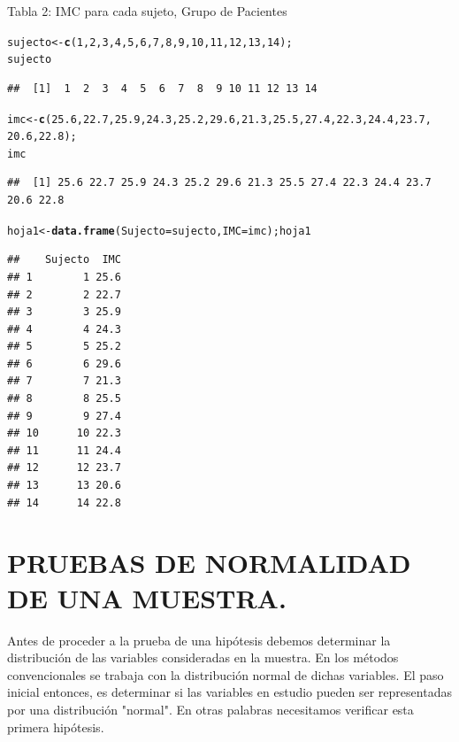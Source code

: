 \documentclass[12pt,letterpaper]{article}\usepackage[]{graphicx}\usepackage[]{color}
\makeatletter
\newcommand{\hlnum}[1]{\textcolor[rgb]{0.686,0.059,0.569}{#1}}%
\newcommand{\hlstd}[1]{\textcolor[rgb]{0.345,0.345,0.345}{#1}}%
\newcommand{\hlkwb}[1]{\textcolor[rgb]{0.69,0.353,0.396}{#1}}%
\newcommand{\hlkwc}[1]{\textcolor[rgb]{0.333,0.667,0.333}{#1}}%
\newcommand{\hlkwd}[1]{\textcolor[rgb]{0.737,0.353,0.396}{\textbf{#1}}}%
\newenvironment{kframe}{%
 \def\at@end@of@kframe{}%
 \ifinner\ifhmode%
  \def\at@end@of@kframe{\end{minipage}}%
  \begin{minipage}{\columnwidth}%
 \fi\fi%
 \def\FrameCommand##1{\hskip\@totalleftmargin \hskip-\fboxsep
 \colorbox{shadecolor}{##1}\hskip-\fboxsep
     \hskip-\linewidth \hskip-\@totalleftmargin \hskip\columnwidth}%
 \MakeFramed {\advance\hsize-\width
   \@totalleftmargin\z@ \linewidth\hsize
   \@setminipage}}%
 {\par\unskip\endMakeFramed%
 \at@end@of@kframe}
\newenvironment{knitrout}{}{} %
\makeatother
\begin{document}
Tabla 2: IMC para cada sujeto, Grupo de Pacientes
\begin{knitrout}
\color{fgcolor}\begin{kframe}
\begin{alltt}
\hlstd{sujecto} \hlkwb{<-} \hlkwd{c}\hlstd{(}\hlnum{1}\hlstd{,} \hlnum{2}\hlstd{,} \hlnum{3}\hlstd{,} \hlnum{4}\hlstd{,} \hlnum{5}\hlstd{,} \hlnum{6}\hlstd{,} \hlnum{7}\hlstd{,} \hlnum{8}\hlstd{,} \hlnum{9}\hlstd{,} \hlnum{10}\hlstd{,} \hlnum{11}\hlstd{,} \hlnum{12}\hlstd{,} \hlnum{13}\hlstd{,} \hlnum{14}\hlstd{);}
\hlstd{sujecto}
\end{alltt}
\begin{verbatim}
##  [1]  1  2  3  4  5  6  7  8  9 10 11 12 13 14
\end{verbatim}
\begin{alltt}
\hlstd{imc} \hlkwb{<-} \hlkwd{c}\hlstd{(}\hlnum{25.6}\hlstd{,} \hlnum{22.7}\hlstd{,} \hlnum{25.9}\hlstd{,} \hlnum{24.3}\hlstd{,} \hlnum{25.2}\hlstd{,} \hlnum{29.6}\hlstd{,} \hlnum{21.3}\hlstd{,} \hlnum{25.5}\hlstd{,} \hlnum{27.4}\hlstd{,} \hlnum{22.3}\hlstd{,} \hlnum{24.4}\hlstd{,} \hlnum{23.7}\hlstd{,}
         \hlnum{20.6}\hlstd{,} \hlnum{22.8}\hlstd{);}
\hlstd{imc}
\end{alltt}
\begin{verbatim}
##  [1] 25.6 22.7 25.9 24.3 25.2 29.6 21.3 25.5 27.4 22.3 24.4 23.7 20.6 22.8
\end{verbatim}
\begin{alltt}
\hlstd{hoja1} \hlkwb{<-} \hlkwd{data.frame}\hlstd{(}\hlkwc{Sujecto}\hlstd{=sujecto,} \hlkwc{IMC}\hlstd{=imc); hoja1}
\end{alltt}
\begin{verbatim}
##    Sujecto  IMC
## 1        1 25.6
## 2        2 22.7
## 3        3 25.9
## 4        4 24.3
## 5        5 25.2
## 6        6 29.6
## 7        7 21.3
## 8        8 25.5
## 9        9 27.4
## 10      10 22.3
## 11      11 24.4
## 12      12 23.7
## 13      13 20.6
## 14      14 22.8
\end{verbatim}
\end{kframe}
\end{knitrout}


\section{PRUEBAS DE NORMALIDAD DE UNA MUESTRA.}


Antes de proceder a la prueba de una hip\'otesis debemos determinar la distribuci\'on de las variables consideradas en la muestra. En los m\'etodos convencionales se trabaja con la distribuci\'on normal de dichas variables. El paso inicial entonces, es determinar si las variables en estudio pueden ser representadas por una distribuci\'on "normal". En otras palabras necesitamos verificar esta primera hip\'otesis.\\
\end{document}
